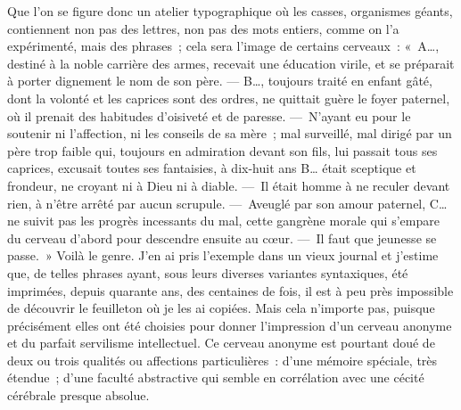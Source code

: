 \documentclass[french,twoside]{book} %
\begin{document}
Que l’on se figure donc un atelier typographique où les casses, organismes géants, contiennent non pas des lettres, non pas des mots entiers, comme on l’a expérimenté, mais des phrases ; cela sera l’image de certains cerveaux : « A…, destiné à la noble carrière des armes, recevait une éducation virile, et se préparait à porter dignement le nom de son père. — B…, toujours traité en enfant gâté, dont la volonté et les caprices sont des ordres, ne quittait guère le foyer paternel, où il prenait des habitudes d’oisiveté et de paresse. — N’ayant eu pour le soutenir ni l’affection, ni les conseils de sa mère ; mal surveillé, mal dirigé par un père trop faible qui, toujours en admiration devant son fils, lui passait tous ses caprices, excusait toutes ses fantaisies, à dix-huit ans B… était sceptique et frondeur, ne croyant ni à Dieu ni à diable. — Il était homme à ne reculer devant rien, à n’être arrêté par aucun scrupule. — Aveuglé par son amour paternel, C… ne suivit pas les progrès incessants du mal, cette gangrène morale qui s’empare du cerveau d’abord pour descendre ensuite au cœur. — Il faut que jeunesse se passe. » Voilà le genre. J’en ai pris l’exemple dans un vieux journal et j’estime que, de telles phrases ayant, sous leurs diverses variantes syntaxiques, été imprimées, depuis quarante ans, des centaines de fois, il est à peu près impossible de découvrir le feuilleton où je les ai copiées. Mais cela n’importe pas, puisque précisément elles ont été choisies pour donner l’impression d’un cerveau anonyme et du parfait servilisme intellectuel. Ce cerveau anonyme est pourtant doué de deux ou trois qualités ou affections particulières : d’une mémoire spéciale, très étendue ; d’une faculté abstractive qui semble en corrélation avec une cécité cérébrale presque absolue.\par
\end{document}
